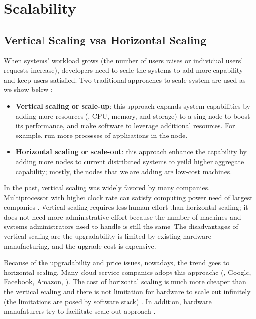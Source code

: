 \section{Scalability}
\label{bg-sc}

\subsection{Vertical Scaling vsa Horizontal Scaling} 

When systems' workload grows (the number of users raises or individual users'
requests increase), developers need to scale the systems to add more capability
and keep users satisfied. Two traditional approaches to scale system are used as
we show below \cite{Michael+07-ScaleUpXScaleOut}:
\begin{itemize}

\item \textbf{Vertical scaling or scale-up}: this approach expands system
capabilities by adding more resources (\eg, CPU, memory, and storage) to a
sing node to boost its performance, and make software to leverage additional
resources. For example, run more processes of applications in the node.

\item \textbf{Horizontal scaling or scale-out}: this approach enhance the
capability by adding more nodes to current distributed systems to yeild higher
aggregate capability; mostly, the nodes that we are adding are low-cost
machines.

\end{itemize}

In the past, vertical scaling was widely favored by many companies.
Multiprocessor with higher clock rate can satisfy computing power need of
largest companies \cite{Michael+07-ScaleUpXScaleOut}. Vertical scaling requires
less human effort than horizontal scaling; it does not need more administrative
effort because the number of machines and systems administrators need to handle
is still the same. The disadvantages of vertical scaling are the upgradability
is limited by existing hardware manufacturing, and the upgrade cost is
expensive.

Because of the upgradability and price issues, nowadays, the trend goes to
horizontal scaling. Many cloud service companies adopt this approache (\eg,
Google, Facebook, Amazon, \etc). The cost of horizontal scaling is much more
cheaper than the vertical scaling and there is not limitation for hardware to
scale out infinitely (the limitations are posed by software stack)
\cite{ScaleUpVsScaleOut}. In addition, hardware manufaturers try to facilitate
scale-out approach \cite{Michael+07-ScaleUpXScaleOut}.

